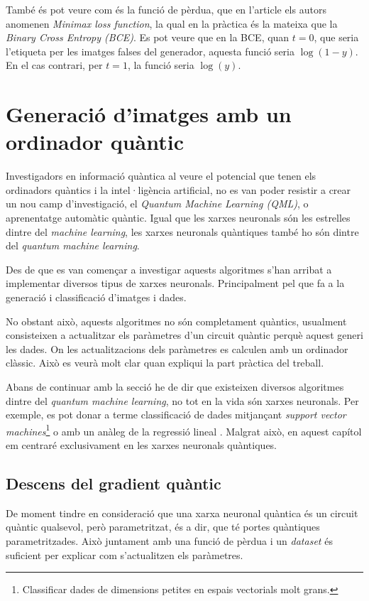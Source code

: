 També és pot veure com és la funció de pèrdua, que en l'article els autors anomenen \textit{Minimax loss function}, la qual en la pràctica és la mateixa que la \textit{Binary Cross Entropy (BCE)}. Es pot veure que en la BCE, quan $t=0$, que seria l'etiqueta per les imatges falses del generador, aquesta funció seria $\log(1-y)$. En el cas contrari, per $t=1$, la funció seria $\log(y)$.



\chapter{Generació d'imatges amb un ordinador quàntic}

Investigadors en informació quàntica al veure el potencial que tenen els ordinadors quàntics i la intel·ligència artificial, no es van poder resistir a crear un nou camp d'investigació, el \textit{Quantum Machine Learning (QML)}, o aprenentatge automàtic quàntic. Igual que les xarxes neuronals són les estrelles dintre del \textit{machine learning}, les xarxes neuronals quàntiques també ho són dintre del \textit{quantum machine learning}.

Des de que es van començar a investigar aquests algoritmes s'han arribat a implementar diversos tipus de xarxes neuronals. Principalment pel que fa a la generació i classificació d'imatges i dades.

No obstant això, aquests algoritmes no són completament quàntics, usualment consisteixen a actualitzar els paràmetres d'un circuit quàntic perquè aquest generi les dades. On les actualitzacions dels paràmetres es calculen amb un ordinador clàssic. Això es veurà molt clar quan expliqui la part pràctica del treball.

Abans de continuar amb la secció he de dir que existeixen diversos algoritmes dintre del \textit{quantum machine learning}, no tot en la vida són xarxes neuronals. Per exemple, es pot donar a terme classificació de dades mitjançant \textit{support vector machines}\footnote{Classificar dades de dimensions petites en espais vectorials molt grans.} \cite{QSVM_2019, QSVM_xanadu_2019} o amb un anàleg de la regressió lineal \cite{Q_linear_regression_xanadu}. Malgrat això, en aquest capítol em centraré exclusivament en les xarxes neuronals quàntiques.

\section{Descens del gradient quàntic}
De moment tindre en consideració que una xarxa neuronal quàntica és un circuit quàntic qualsevol, però parametritzat, és a dir, que té portes quàntiques parametritzades. Això juntament amb una funció de pèrdua i un \textit{dataset} és suficient per explicar com s'actualitzen els paràmetres.

